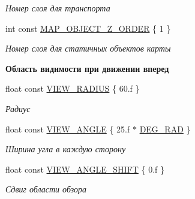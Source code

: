 \begin{Indent}
\begin{DoxyCompactItemize}
\begin{DoxyCompactList}\small\item\em Номер слоя для транспорта \end{DoxyCompactList}\item 
\mbox{\label{namespacertm_a93638d5f93c88f66fa540452aba5d658}} 
int const \hyperlink{namespacertm_a93638d5f93c88f66fa540452aba5d658}{M\+A\+P\+\_\+\+O\+B\+J\+E\+C\+T\+\_\+\+Z\+\_\+\+O\+R\+D\+ER} \{ 1 \}
\begin{DoxyCompactList}\small\item\em Номер слоя для статичных объектов карты \end{DoxyCompactList}\end{DoxyCompactItemize}
\end{Indent}
\begin{Indent}\textbf{ Область видимости при движении вперед}\par
\begin{DoxyCompactItemize}
\item 
\mbox{\label{namespacertm_a6ae2631935a995c34abce1c62fa3dcd7}} 
float const \hyperlink{namespacertm_a6ae2631935a995c34abce1c62fa3dcd7}{V\+I\+E\+W\+\_\+\+R\+A\+D\+I\+US} \{ 60.f \}
\begin{DoxyCompactList}\small\item\em Радиус \end{DoxyCompactList}\item 
\mbox{\label{namespacertm_af0ecac808d3938e77a20990f1947c8fd}} 
float const \hyperlink{namespacertm_af0ecac808d3938e77a20990f1947c8fd}{V\+I\+E\+W\+\_\+\+A\+N\+G\+LE} \{ 25.f $\ast$ \hyperlink{namespacertm_a797faf3037681ed7bc153db9eca6155e}{D\+E\+G\+\_\+\+R\+AD} \}
\begin{DoxyCompactList}\small\item\em Ширина угла в каждую сторону \end{DoxyCompactList}\item 
\mbox{\label{namespacertm_a10eed490bb183c7853ac317d82e0b1cd}} 
float const \hyperlink{namespacertm_a10eed490bb183c7853ac317d82e0b1cd}{V\+I\+E\+W\+\_\+\+A\+N\+G\+L\+E\+\_\+\+S\+H\+I\+FT} \{ 0.f \}
\begin{DoxyCompactList}\small\item\em Сдвиг области обзора \end{DoxyCompactList}\end{DoxyCompactItemize}
\end{Indent}
